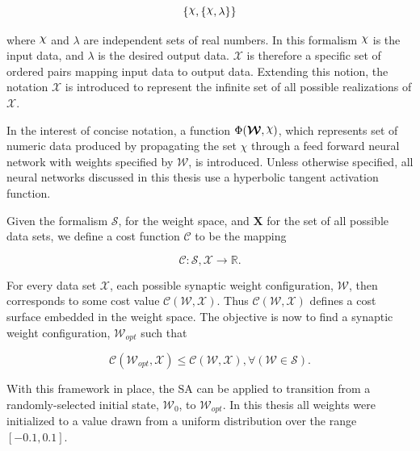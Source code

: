 \documentclass[11pt]{afthesis}
\DeclareRobustCommand{\rchi}{{\mathpalette\irchi\relax}}
\newcommand{\irchi}[2]{\raisebox{\depth}{$#1\chi$}}
\begin{document}
	 \begin{equation*} \label{eq:data_ordered_pairs}
	 \{\rchi, \{ \rchi, \lambda \}\}
	 \end{equation*}
	 
	 \noindent where $\rchi$ and $\lambda$ are independent sets of real numbers. In this formalism $\rchi$ is the input data, and $\lambda$ is the desired output data. $\mathcal{X}$ is therefore a specific set of ordered pairs mapping input data to output data. Extending this notion, the notation $\boldsymbol{\mathcal{X}}$ is introduced to represent the infinite set of all possible realizations of $\mathcal{X}$.
	 	 
	 	 
	 
	 In the interest of concise notation, a function $\Phi(\boldsymbol{\mathcal{W}}, \rchi)$, which represents set of numeric data produced by propagating the set $\chi$ through a feed forward neural network with weights specified by $\boldsymbol{\mathcal{W}}$, is introduced. Unless otherwise specified, all neural networks discussed in this thesis use a hyperbolic tangent activation function.
	 
	 
	 Given the formalism $\boldsymbol{\mathcal{S}}$, for the weight space, and $\boldsymbol{X}$ for the set of all possible data sets, we define a cost function $ \mathcal{C}$ to be the mapping
	 
	 \begin{equation*} \label{eq:cost_mapping_ffnn}
	 \mathcal{C} : \boldsymbol{\mathcal{S}},\boldsymbol{\mathcal{X}} \rightarrow \mathbb{R}.
	 \end{equation*}
	 
	 \noindent For every data set $\mathcal{X}$, each possible synaptic weight configuration, $\boldsymbol{\mathcal{W}}$, then corresponds to some cost value $\mathcal{C}(\boldsymbol{\mathcal{W}},\mathcal{X})$. Thus $\mathcal{C}(\boldsymbol{\mathcal{W}},\mathcal{X})$ defines a cost surface embedded in the weight space. The objective is now to find a synaptic weight configuration, $\boldsymbol{\mathcal{W}}_{opt}$ such that 
	 
	 \begin{equation*} \label{eq:optimal_definition}
	 \mathcal{C}(\boldsymbol{\mathcal{W}}_{opt},\mathcal{X}) \leq \mathcal{C}\left( \boldsymbol{\mathcal{W}},\mathcal{X}\right) , \forall\left(  \boldsymbol{\mathcal{W}} \in \boldsymbol{\mathcal{S}}\right) .
	 \end{equation*}
	 
	 \noindent With this framework in place, the SA can be applied to transition from a randomly-selected initial state, $\boldsymbol{\mathcal{W}}_0$, to $\boldsymbol{\mathcal{W}}_{opt}$. In this thesis all weights were initialized to a value drawn from a uniform distribution over the range $[-0.1,0.1]$. 
	 
\end{document}
